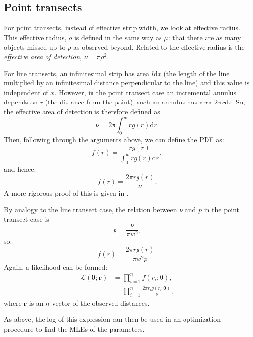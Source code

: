\subsection{Point transects} 

For point transects, instead\label{cor-7s8} of effective strip width, we look at effective radius. This effective radius, $\rho$ is defined in the same way as $\mu$: that there are as many objects missed up to $\rho$ as observed beyond. Related to the effective radius is the \textit{effective area of detection}, $\nu=\pi \rho^2$.

For line transects, an infinitesimal strip has area $l\text{d}x$ (the length of the line multiplied by an infinitesimal distance perpendicular to the line) and this value is independent of $x$. However, in the point transect case an incremental annulus depends on $r$ (the distance from the point), such an annulus has area $2\pi r \text{d}r$. So, the effective area of detection is therefore defined as:
\begin{equation*}
\nu = 2 \pi \int_0^w r g(r) \text{d}r.
\end{equation*}
Then, following through the arguments above, we can define the PDF as:
\begin{equation*}
f(r) = \frac{r g(r)}{\int_0^w r g(r) \text{d}r},
\end{equation*}
and hence: 
\begin{equation*}
f(r) = \frac{2 \pi r g(r)}{\nu}.
\end{equation*}
A more rigorous proof of this is given in .

By analogy to the line transect case, the relation between $\nu$ and $p$ in the point transect case is
\begin{equation*}
p=\frac{\nu}{\pi w^2},
\end{equation*}
so:
\begin{equation*}
f(r) = \frac{2 \pi r g(r)}{\pi w^2 p}.
\end{equation*}
Again, a likelihood can be formed:
\begin{align*}
\mathcal{L}(\bm{\theta}; \bm{r}) &= \prod_{i=1}^n f(r_i;\bm{\theta}),\\
&= \prod_{i=1}^n \frac{2 \pi r_i g(r_i;\bm{\theta})}{\nu},
\end{align*}
where $\bm{r}$ is an $n$-vector of the observed distances. 

As above, the log of this expression can then be used in an optimization procedure to find the MLEs of the parameters.

